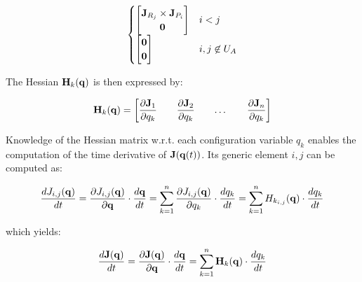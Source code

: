\documentclass[10pt,landscape,a4paper]{article}
\begin{document}
\begin{multicols}{2}
\begin{equation}
\begin{cases}
\begin{bmatrix}
\mathbf J_{R_j} \times \mathbf J_{P_i} \\ 
\mathbf{0} \\
\end{bmatrix} & i < j \\

\begin{bmatrix}
\mathbf{0} \\ 
\mathbf{0} \\
\end{bmatrix} & i,j \not\in U_A
\end{cases}
\end{equation}

The Hessian $\mathbf H_k(\mathbf q)$ is then expressed by:

\begin{equation}
\mathbf H_k(\mathbf q) =
\begin{bmatrix}
\dfrac{\partial \mathbf J_1}{\partial q_k} && \dfrac{\partial \mathbf J_2}{\partial q_k} && \dots && \dfrac{\partial \mathbf J_n}{\partial q_k}
\end{bmatrix}
\end{equation}

Knowledge of the Hessian matrix w.r.t. each configuration variable $q_k$ enables the computation of the time derivative of $\mathbf J(\mathbf q(t))$. Its generic element $i,j$ can be computed as:

\begin{equation}
\begin{aligned}
\dfrac{d J_{i,j}(\mathbf q)}{dt}
=
\dfrac{\partial J_{i,j}(\mathbf q)}{\partial \mathbf q} \cdot \dfrac{d\mathbf q}{dt}
=
\sum_{k=1}^{n} \dfrac{\partial J_{i,j}(\mathbf q)}{\partial q_k} \cdot \dfrac{dq_k}{dt}
=
\sum_{k=1}^{n} H_{k_{i,j}}(\mathbf q) \cdot \dfrac{dq_k}{dt}
\end{aligned}
\end{equation}

which yields:

\begin{equation}
\dfrac{d\mathbf J(\mathbf q)}{dt}
=
\dfrac{\partial \mathbf J(\mathbf q)}{\partial \mathbf q} \cdot \dfrac{d\mathbf q}{dt}
=
\sum_{k=1}^{n} \mathbf{H}_k(\mathbf q) \cdot  \dfrac{dq_k}{dt}
\end{equation}


\clearpage




\end{multicols}
\end{document}
